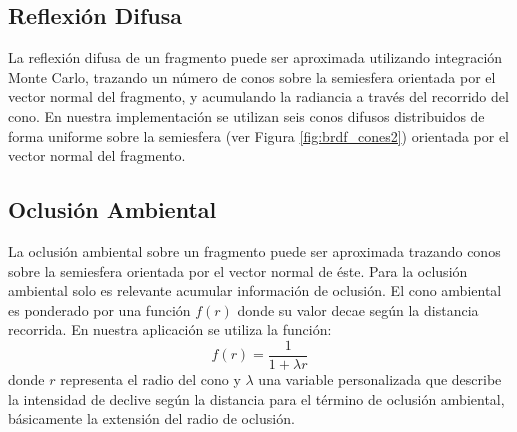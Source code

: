 \subsection{Reflexión Difusa}
La reflexión difusa de un fragmento puede ser aproximada utilizando integración Monte Carlo, trazando un número de conos sobre la semiesfera orientada por el vector normal del fragmento, y acumulando la radiancia a través del recorrido del cono. En nuestra implementación se utilizan seis conos difusos distribuidos de forma uniforme sobre la semiesfera (ver Figura \ref{fig:brdf_cones2}) orientada por el vector normal del fragmento.
\subsection{Oclusión Ambiental}
\label{sub:occl_ambt_prop}
La oclusión ambiental sobre un fragmento puede ser aproximada trazando conos sobre la semiesfera orientada por el vector normal de éste. Para la oclusión ambiental solo es relevante acumular información de oclusión. El cono ambiental es ponderado por una función $f(r)$ donde su valor decae según la distancia recorrida. En nuestra aplicación se utiliza la función:
\begin{equation}
	f(r) = \frac{1}{1+\lambda r}
\end{equation} donde $r$ representa el radio del cono y $\lambda$ una variable personalizada que describe la intensidad de declive según la distancia para el término de oclusión ambiental, básicamente la extensión del radio de oclusión.
